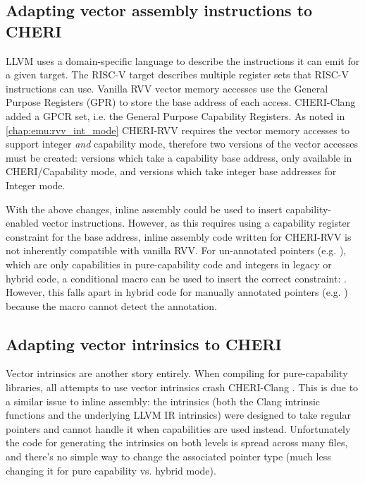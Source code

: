 \documentclass[../thesis]{subfiles}
\begin{document}
\subsection{Adapting vector assembly instructions to CHERI}
LLVM uses a domain-specific language to describe the instructions it can emit for a given target.
The RISC-V target describes multiple register sets that RISC-V instructions can use.
Vanilla RVV vector memory accesses use the General Purpose Registers (GPR) to store the base address of each access.
CHERI-Clang added a GPCR set, i.e. the General Purpose Capability Registers.
As noted in \cref{chap:emu:rvv_int_mode} CHERI-RVV requires the vector memory accesses to support integer \emph{and} capability mode, therefore two versions of the vector accesses must be created: versions which take a capability base address, only available in CHERI/Capability mode, and versions which take integer base addresses for Integer mode.

With the above changes, inline assembly could be used to insert capability-enabled vector instructions.
However, as this requires using a capability register constraint for the base address, inline assembly code written for CHERI-RVV is not inherently compatible with vanilla RVV.
For un-annotated pointers (e.g. ), which are only capabilities in pure-capability code and integers in legacy or hybrid code, a conditional macro can be used to insert the correct constraint: .
However, this falls apart in hybrid code for manually annotated pointers (e.g. ) because the macro cannot detect the annotation.


\subsection{Adapting vector intrinsics to CHERI}
Vector intrinsics are another story entirely.
When compiling for pure-capability libraries, all attempts to use vector intrinsics crash CHERI-Clang .
This is due to a similar issue to inline assembly: the intrinsics (both the Clang intrinsic functions and the underlying LLVM IR intrinsics) were designed to take regular pointers and cannot handle it when capabilities are used instead.
Unfortunately the code for generating the intrinsics on both levels is spread across many files, and there's no simple way to change the associated pointer type (much less changing it for pure capability vs. hybrid mode).
\end{document}
